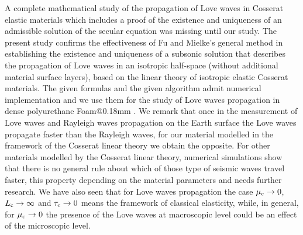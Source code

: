 \documentclass[10pt]{article}
\begin{document}
A complete mathematical study of the propagation of Love waves in Cosserat elastic materials which includes a proof of the existence and uniqueness of an admissible solution of the secular equation was missing until our study.
The present study confirms the effectiveness of Fu and Mielke's general method in establishing the existence and uniqueness of a subsonic solution that describes the propagation of Love waves in an isotropic half-space (without additional material surface layers), based on the linear theory of isotropic elastic Cosserat materials.  The given formulas and the given algorithm admit numerical implementation and we use them for the study of Love waves propagation in  dense polyurethane  {Foam@0.18mm}  \cite{Lakes83,lakes1987foam}. We remark that once in the measurement of Love waves and Rayleigh waves propagation on the Earth surface the Love waves propagate faster than the Rayleigh waves, for our material modelled in the framework of the Cosserat linear theory we obtain the opposite. For other materials modelled by the Cosserat linear theory, numerical simulations show that there is no general rule about which of those type of seismic waves travel faster, this 
property depending on the material parameters  {and needs further research}. We have also seen that for Love waves propagation the case $\mu_{\rm c}\to 0$, $ L_{\rm c}\to \infty$ and $ \tau_{\rm c}\to 0$  means the framework of classical elasticity, while, in general, for $\mu_{\rm c}\to 0$ the presence of the Love waves at macroscopic level could be an effect of the microscopic level.
\bigskip
\end{document}
